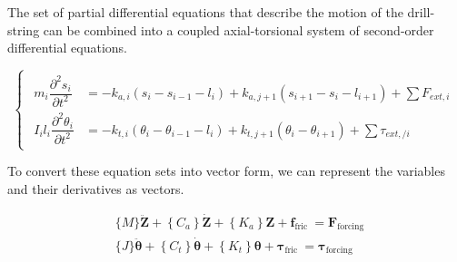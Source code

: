 The set of partial differential equations that describe the motion of the drill-string can be combined into a coupled axial-torsional system of second-order differential equations. 

\begin{equation}\label{Governing equations}
  \begin{cases}
   \begin{aligned}
     m_{i}\dfrac{\partial^{2}s_{i}}{\partial t^{2}} & = -k_{a,i}(s_{i}-s_{i-1}-l_{i}) + k_{a,j+1}(s_{i+1}-s_{i}-l_{i+1}) + \sum{F_{ext, i}} \\
     I_{i}l_{i}\dfrac{\partial^{2}\theta_{i}}{\partial t^{2}} & = -k_{t,i}(\theta_{i}-\theta_{i-1}-l_{i}) + k_{t,j+1}(\theta_{i}-\theta_{i+1}) + \sum{\tau_{ext,/ i}}
   \end{aligned}
  \end{cases}
\end{equation}

To convert these equation sets into vector form, we can represent the variables and their derivatives as vectors.

\begin{equation}\label{Vector_form}
  \begin{aligned}
  & \{M\} \ddot{\boldsymbol{Z}}+\left\{C_a\right\} \dot{\boldsymbol{Z}}+\left\{K_a\right\} \boldsymbol{Z}+\boldsymbol{f}_{\text {fric }}=\boldsymbol{F}_{\text {forcing }} \\
  & \{J\} \ddot{\boldsymbol{\theta}}+\left\{C_t\right\} \dot{\boldsymbol{\theta}}+\left\{K_t\right\} \boldsymbol{\theta}+\boldsymbol{\tau}_{\text {fric }}=\boldsymbol{\tau}_{\text {forcing }}
  \end{aligned}
\end{equation}


